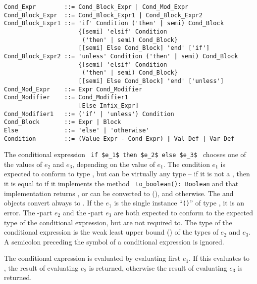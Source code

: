 \syntax\begin{lstlisting}
Cond_Expr        ::= Cond_Block_Expr | Cond_Mod_Expr
Cond_Block_Expr  ::= Cond_Block_Expr1 | Cond_Block_Expr2
Cond_Block_Expr1 ::= 'if' Condition ('then' | semi) Cond_Block 
                     {[semi] 'elsif' Condition 
                      ('then' | semi) Cond_Block}
                     [[semi] Else Cond_Block] 'end' ['if']
Cond_Block_Expr2 ::= 'unless' Condition ('then' | semi) Cond_Block 
                     {[semi] 'elsif' Condition 
                      ('then' | semi) Cond_Block}
                     [[semi] Else Cond_Block] 'end' ['unless']
Cond_Mod_Expr    ::= Expr Cond_Modifier
Cond_Modifier    ::= Cond_Modifier1
                     [Else Infix_Expr]
Cond_Modifier1   ::= ('if' | 'unless') Condition 
Cond_Block       ::= Expr | Block
Else             ::= 'else' | 'otherwise'
Condition        ::= (Value_Expr - Cond_Expr) | Val_Def | Var_Def
\end{lstlisting}

The conditional expression ~\lstinline!if $e_1$ then $e_2$ else $e_3$!~ chooses one of the values of $e_2$ and $e_3$, depending on the value of $e_1$. The condition $e_1$ is expected to conform to type , but can be virtually any type -- if it is not a , then it is equal to  if it implements the method ~\lstinline!to_boolean(): Boolean! and that implementation returns , or can be converted to  (), and  otherwise. The  and  objects convert always to . If the $e_1$ is the single instance ``\lstinline!()!'' of type , it is an error. The -part $e_2$ and the -part $e_3$ are both expected to conform to the expected type of the conditional expression, but are not required to. The type of the conditional expression is the weak least upper bound () of the types of $e_2$ and $e_3$. A semicolon preceding the  symbol of a conditional expression is ignored. 

The conditional expression is evaluated by evaluating first $e_1$. If this evaluates to , the result of evaluating $e_2$ is returned, otherwise the result of evaluating $e_3$ is returned. 

